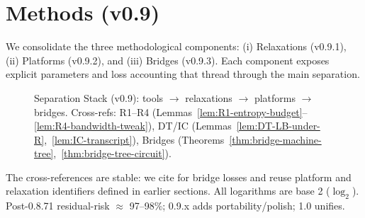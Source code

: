 \section{Methods (v0.9)}
We consolidate the three methodological components: (i) Relaxations (v0.9.1), (ii) Platforms (v0.9.2), and (iii) Bridges (v0.9.3). Each component exposes explicit parameters and loss accounting that thread through the main separation.

\begin{figure}[H]
  \centering
  
  \caption{Separation Stack (v0.9): tools $\to$ relaxations $\to$ platforms $\to$ bridges. Cross-refs: R1--R4 (Lemmas~\ref{lem:R1-entropy-budget}--\ref{lem:R4-bandwidth-tweak}), DT/IC (Lemmas~\ref{lem:DT-LB-under-R},~\ref{lem:IC-transcript}), Bridges (Theorems~\ref{thm:bridge-machine-tree},~\ref{thm:bridge-tree-circuit}).}
  \label{fig:stack}
\end{figure}

The cross-references are stable: we cite  for bridge losses and reuse platform and relaxation identifiers defined in earlier sections. All logarithms are base 2 ($\log_{2}$). Post-0.8.71 residual-risk $\approx$ 97--98\%; 0.9.x adds portability/polish; 1.0 unifies.